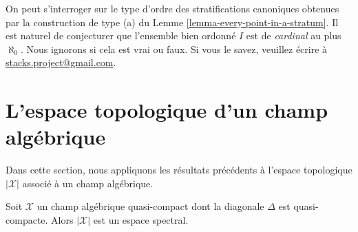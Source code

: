 \begin{remark}
\label{remark-order-type}
On peut s'interroger sur le type d'ordre des stratifications canoniques
obtenues par la construction de type (a) du
Lemme \ref{lemma-every-point-in-a-stratum}. Il est naturel de conjecturer que
l'ensemble bien ordonné $I$ est de {\it cardinal} au plus $\aleph_0$.
Nous ignorons si cela est vrai ou faux. Si vous le savez, veuillez écrire à
\href{mailto:stacks.project@gmail.com}{stacks.project@gmail.com}.
\end{remark}







\section{L'espace topologique d'un champ algébrique}
\label{section-topology}

\noindent
Dans cette section, nous appliquons les résultats précédents à l'espace
topologique $|\mathcal{X}|$ associé à un champ algébrique.

\begin{lemma}
\label{lemma-spectral-qc-diagonal-qc}
Soit $\mathcal{X}$ un champ algébrique quasi-compact dont la diagonale
$\Delta$ est quasi-compacte. Alors $|\mathcal{X}|$ est un espace spectral.
\end{lemma}

